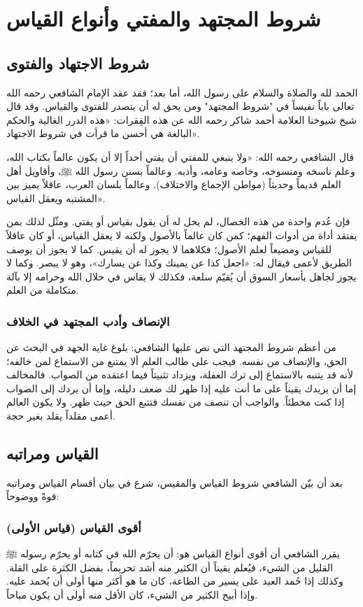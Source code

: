 \chapter{شروط المجتهد والمفتي وأنواع القياس}

\section{شروط الاجتهاد والفتوى}
الحمد لله والصلاة والسلام على رسول الله، أما بعد؛ فقد عقد الإمام الشافعي رحمه الله تعالى باباً نفيساً في "شروط المجتهد" ومن يحق له أن يتصدر للفتوى والقياس. وقد قال شيخ شيوخنا العلامة أحمد شاكر رحمه الله عن هذه الفِقرات: «هذه الدرر الغالية والحكم البالغة هي أحسن ما قرأت في شروط الاجتهاد».

قال الشافعي رحمه الله: «ولا ينبغي للمفتي أن يفتي أحداً إلا أن يكون عالماً بكتاب الله، وعلم ناسخه ومنسوخه، وخاصه وعامه، وأدبه. وعالماً بسنن رسول الله ﷺ، وأقاويل أهل العلم قديماً وحديثاً (مواطن الإجماع والاختلاف). وعالماً بلسان العرب، عاقلاً يميز بين المشتبه ويعقل القياس».

فإن عُدم واحدة من هذه الخصال، لم يحل له أن يقول بقياس أو يفتي. ومثّل لذلك بمن يفتقد أداة من أدوات الفهم؛ كمن كان عالماً بالأصول ولكنه لا يعقل القياس، أو كان عاقلاً للقياس ومضيعاً لعلم الأصول؛ فكلاهما لا يجوز له أن يقيس. 
كما لا يجوز أن يوصف الطريق لأعمى فيقال له: «اجعل كذا عن يمينك وكذا عن يسارك»، وهو لا يبصر. وكما لا يجوز لجاهل بأسعار السوق أن يُقيّم سلعة، فكذلك لا يقاس في حلال الله وحرامه إلا بآلة متكاملة من العلم.

\subsection{الإنصاف وأدب المجتهد في الخلاف}
من أعظم شروط المجتهد التي نص عليها الشافعي: بلوغ غاية الجهد في البحث عن الحق، والإنصاف من نفسه.
فيجب على طالب العلم ألا يمتنع من الاستماع لمن خالفه؛ لأنه قد يتنبه بالاستماع إلى ترك الغفلة، ويزداد تثبيتاً فيما اعتقده من الصواب. فالمخالف إما أن يزيدك يقيناً على ما أنت عليه إذا ظهر لك ضعف دليله، وإما أن يردك إلى الصواب إذا كنت مخطئاً. والواجب أن تنصف من نفسك فتتبع الحق حيث ظهر. ولا يكون العالم أعمى مقلداً يقلد بغير حجة.

\section{القياس ومراتبه}
بعد أن بيّن الشافعي شروط القياس والمقيس، شرع في بيان أقسام القياس ومراتبه قوةً ووضوحاً:

\subsection{أقوى القياس (قياس الأولى)}
يقرر الشافعي أن أقوى أنواع القياس هو: أن يحرّم الله في كتابه أو يحرّم رسوله ﷺ القليل من الشيء، فيُعلم يقيناً أن الكثير منه أشد تحريماً، بفضل الكثرة على القلة. 
وكذلك إذا حُمد العبد على يسير من الطاعة، كان ما هو أكثر منها أولى أن يُحمد عليه. وإذا أبيح الكثير من الشيء، كان الأقل منه أولى أن يكون مباحاً.

